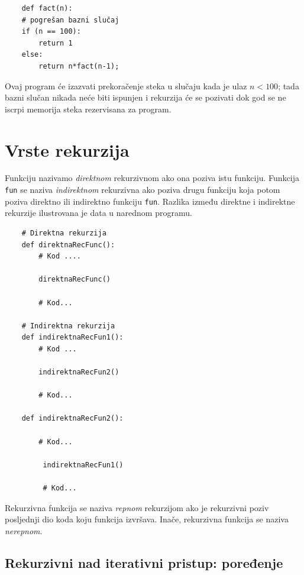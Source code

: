 \begin{verbatim}
	def fact(n):
	# pogrešan bazni slučaj 
	if (n == 100): 
	    return 1	
	else:
	    return n*fact(n-1);
\end{verbatim}

Ovaj program će izazvati prekoračenje steka u slučaju kada je ulaz $n<100$;  tada bazni slučan nikada neće biti ispunjen i rekurzija će se pozivati dok god se ne iscrpi memorija steka rezervisana za program.

\section{Vrste rekurzija}

Funkciju  nazivamo \textit{direktnom} rekurzivnom ako ona poziva istu funkciju. Funkcija \texttt{fun} se naziva \textit{indirektnom} rekurzivna ako poziva drugu funkciju koja potom poziva direktno ili indirektno funkciju \texttt{fun}. Razlika između direktne i indirektne rekurzije ilustrovana je data u narednom programu.

\begin{verbatim}
	# Direktna rekurzija
	def direktnaRecFunc():
	    # Kod ....
	
	    direktnaRecFunc()
	
	    # Kod...
	
	# Indirektna rekurzija
	def indirektnaRecFun1():
	    # Kod ...
	
	    indirektnaRecFun2()
	
	    # Kod...
	
	def indirektnaRecFun2():
	
	    # Kod...
	
	     indirektnaRecFun1()
	
	     # Kod...
\end{verbatim}



Rekurzivna funkcija se naziva \textit{repnom} rekurzijom ako je rekurzivni poziv posljednji dio koda koju funkcija izvršava. Inače, rekurzivna funkcija se naziva \textit{nerepnom}.
 
\subsection{Rekurzivni nad iterativni pristup: poređenje}


